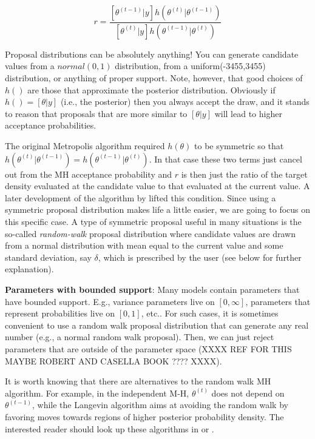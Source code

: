 \[
r = \frac{ [\theta^{(t-1)}|y] h(\theta^{(t)}|\theta^{(t-1)})}
    {[\theta^{(t)}|y] h(\theta^{(t-1)}|\theta^{(t)}) }
\]

Proposal distributions can be absolutely
anything!  You can generate candidate values from a $normal(0,1)$
distribution, from a uniform(-3455,3455) distribution, or anything of
proper support.  Note, however, that good choices of $h()$ are those
that approximate the posterior distribution. Obviously if $h() =
[\theta|y]$ (i.e., the posterior) then you always accept the draw,
and it stands to reason that proposals that are more similar to
$[\theta|y]$ will lead to higher acceptance probabilities. 

The original Metropolis algorithm
required $h(\theta)$ to be symmetric so that
$h(\theta^{(t)}|\theta^{(t-1)}) = h(\theta^{(t-1)}|\theta^{(t)})$. 
In that case these two terms just cancel
out from the MH acceptance probability and $r$ is then just the ratio
of the target density evaluated at the candidate value to that
evaluated at the current value. A later
development of the algorithm by \citet{hastings:1970} lifted this
condition. 
Since using a symmetric proposal distribution makes life a little
easier, we are going to focus on this specific case. A type of symmetric proposal useful in many situations is the
so-called {\it random-walk} proposal distribution where candidate values
are drawn from a normal distribution with mean equal to the current
value and some standard deviation, say $\delta$, which is prescribed by
the user (see below for further explanation). 

{\bf Parameters with bounded support}: Many models contain parameters that
have  bounded support. E.g., variance parameters live on $[0,\infty]$,
parameters that represent probabilities live on $[0,1]$, etc..
For such cases, it is sometimes convenient to use a random
walk proposal distribution that can generate any real number (e.g., a
normal random walk proposal). Then, 
we can just reject parameters that are
outside of the parameter space (XXXX REF FOR THIS MAYBE ROBERT AND
CASELLA BOOK ???? XXXX).

It is worth
knowing that there are alternatives to the random walk MH algorithm. For
example, in the independent M-H, $\theta^{(t)}$ does not depend on
$\theta^{(t-1)}$, while the Langevin algorithm \citep{roberts_etal:1998}
aims at avoiding the random walk by favoring moves towards regions of
higher posterior probability density. The interested reader should
look up these algorithms in \citet{robert_casella:2004} or
\citet{robert_casella:2010}.


